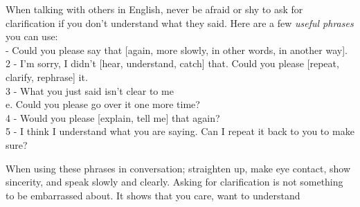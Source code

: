 
When talking with others in English, never be afraid or shy to ask for
clarification if you don't understand what they said.  Here are a few {\em useful phrases} you can use: \\
{\scriptsize
{} - Could you please say that [again, more slowly, in other words, in another way]. \\
2 - I'm sorry, I didn't [hear, understand, catch] that. Could you please [repeat, clarify, rephrase] it. \\
3 - What you just said isn't clear to me \\
e. Could you please go over it one more time? \\
4 - Would you please [explain, tell me] that again? \\
5 - I think I understand what you are saying. Can I repeat it back to you to make sure? \\
}

When using these phrases in conversation; straighten up, make eye contact, show sincerity, and speak slowly and clearly.
Asking for clarification is not something to be embarrassed about. It shows that you care, want to understand

